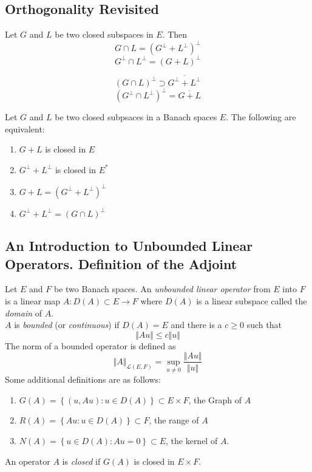 \subsection{Orthogonality Revisited}

\begin{prop}
Let $G$ and $L$ be two closed subspaces in $E$. Then
\[
	G \cap L = \left( G^{\perp} + L^{\perp} \right)^{\perp}
\]
\[
	G^{\perp} \cap L^{\perp} = \left( G + L \right)^{\perp}
\]

\end{prop}


\begin{cor}
	\[
		\left( G \cap L \right)^{\perp} \supset \overline{G^{\perp} + L^{\perp}}
	\]
	\[
		\left( G^{\perp} \cap L^{\perp} \right)^{\perp} = \overline{G + L}
	\]
	
\end{cor}

\begin{thm}
Let $G$ and $L$ be two closed subpsaces in a Banach spaces $E$. The following are equivalent:
\begin{enumerate}
	\item $G+L$ is closed in $E$
	\item $G^{\perp} + L^{\perp}$ is closed in $E^{*}$
	\item $G+L = \left( G^{\perp} + L^{\perp} \right)^{\perp}$
	\item $G^{\perp} + L^{\perp} = \left( G \cap L \right)^{\perp}$
\end{enumerate}
\end{thm}

\subsection{An Introduction to Unbounded Linear Operators. Definition of the Adjoint}

\begin{defn}
	Let $E$ and $F$ be two Banach spaces. An \textit{unbounded linear operator} from $E$ into $F$ is a linear map $A: D(A) \subset E \to F$ where $D(A)$ is a linear subspace called the \textit{domain} of $A$. \\
	\indent $A$ is \textit{bounded} (or \textit{continuous}) if $D(A) = E$ and there is a $c \geq 0$ such that
	\[
	\Vert Au \Vert \leq c \Vert u \Vert
	\]
	The norm of a bounded operator is defined as
	\[
		\Vert A \Vert_{ \mathcal{L}(E,F)} = \sup_{u \neq 0} \frac{ \Vert Au \Vert}{ \Vert u \Vert} 
	\]
	Some additional definitions are as follows:
	\begin{enumerate}
		\item $G(A) = \left\{ (u, Au): u \in D(A) \right\} \subset E \times F$, the Graph of $A$
		\item $R(A) = \left\{ Au: u \in D(A) \right\} \subset F$, the range of $A$
		\item $N(A) = \left\{ u \in D(A): Au=0 \right\} \subset E$, the kernel of $A$.
	\end{enumerate}
	An operator $A$ is \textit{closed} if $G(A)$ is closed in $E \times F$.
	
\end{defn}

